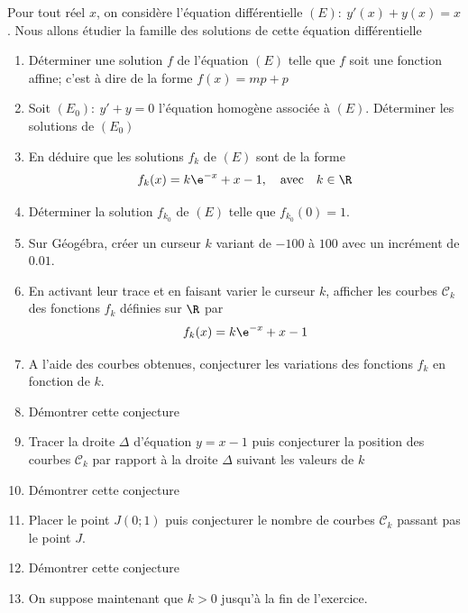 \begin{exercice_cours}[\quad]{}

Pour tout réel $x$, on considère l'équation différentielle $(E):\:y'(x)+y(x)=x$. Nous allons étudier la famille des solutions de cette équation différentielle


\begin{enumerate}
	\item Déterminer une solution $f$ de l'équation $(E)$ telle que $f$ soit une fonction affine; c'est à dire de la forme $f(x)=mp+p$
	
	\item Soit $(E_0):\: y'+y=0$ l'équation homogène associée à $(E)$. Déterminer les solutions de $(E_0)$
	
	\item En déduire que les solutions $f_k$ de $(E)$ sont de la forme $$f_k(x)=k\e^{-x}+x-1, \quad \text{avec} \quad k\in\R$$
	
	\item Déterminer la solution $f_{k_0}$ de $(E)$ telle que $f_{k_0}(0)=1$.
	
	\item Sur Géogébra, créer un curseur $k$ variant de $-100$ à $100$ avec un incrément de $0.01$.
	
	\item En activant leur trace et en faisant varier le curseur $k$, afficher les courbes $\mathcal{C}_k$ des fonctions $f_k$ définies sur $\R$ par $$f_k(x)=k\e^{-x}+x-1$$
	
	\item A l'aide des courbes obtenues, conjecturer les variations des fonctions $f_k$ en fonction de $k$.
	
	\item Démontrer cette conjecture
	
	\item Tracer la droite $\Delta$ d'équation $y=x-1$ puis conjecturer la position des courbes $\mathcal{C}_k$ par rapport à la droite $\Delta$ suivant les valeurs de $k$
	
	\item Démontrer cette conjecture
	
	\item Placer le point $J(0;1)$ puis conjecturer le nombre de courbes $\mathcal{C}_k$ passant pas le point $J$.
	
	\item Démontrer cette conjecture
	
	\item On suppose maintenant que $k>0$ jusqu'à la fin de l'exercice.
	

\end{enumerate}
\end{exercice_cours}
